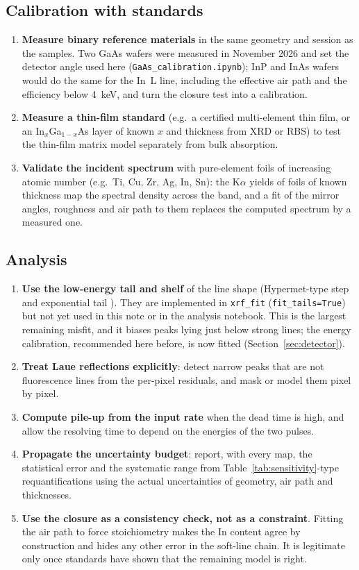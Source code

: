 \documentclass[11pt,a4paper]{article}
\newcommand{\code}[1]{\texttt{#1}}
\begin{document}
\subsection{Calibration with standards}
\begin{enumerate}[leftmargin=*,itemsep=2pt,resume]
\item \textbf{Measure binary reference materials} in the same geometry and session as the samples. Two
GaAs wafers were measured in November 2026 and set the detector angle used here
(\code{GaAs\_calibration.ipynb}); InP and InAs wafers would do the same for the In~L line, including the
effective air path and the efficiency below \qty{4}{keV}, and turn the closure test into a calibration.
\item \textbf{Measure a thin-film standard} (e.g.\ a certified multi-element thin film, or an In$_x$Ga$_{1-x}$As
layer of known $x$ and thickness from XRD or RBS) to test the thin-film matrix model separately from bulk
absorption.
\item \textbf{Validate the incident spectrum} with pure-element foils of increasing atomic number (e.g.\ Ti,
Cu, Zr, Ag, In, Sn): the K$\alpha$ yields of foils of known thickness map the spectral density across the band,
and a fit of the mirror angles, roughness and air path to them replaces the computed spectrum by a
measured one.
\end{enumerate}

\subsection{Analysis}
\begin{enumerate}[leftmargin=*,itemsep=2pt,resume]
\item \textbf{Use the low-energy tail and shelf} of the line shape (Hypermet-type step and exponential
tail \citep{Phillips1976}). They are implemented in \code{xrf\_fit} (\code{fit\_tails=True}) but not yet
used in this note or in the analysis notebook. This is the largest remaining misfit, and it biases peaks
lying just below strong lines; the energy calibration, recommended here before, is now fitted
(Section~\ref{sec:detector}).
\item \textbf{Treat Laue reflections explicitly}: detect narrow peaks that are not fluorescence lines from the
per-pixel residuals, and mask or model them pixel by pixel.
\item \textbf{Compute pile-up from the input rate} when the dead time is high, and allow the resolving
time to depend on the energies of the two pulses.
\item \textbf{Propagate the uncertainty budget}: report, with every map, the statistical error and the
systematic range from Table~\ref{tab:sensitivity}-type requantifications using the actual uncertainties of
geometry, air path and thicknesses.
\item \textbf{Use the closure as a consistency check, not as a constraint}. Fitting the air path to force
stoichiometry makes the In content agree by construction and hides any other error in the soft-line chain.
It is legitimate only once standards have shown that the remaining model is right.
\end{enumerate}
\end{document}
